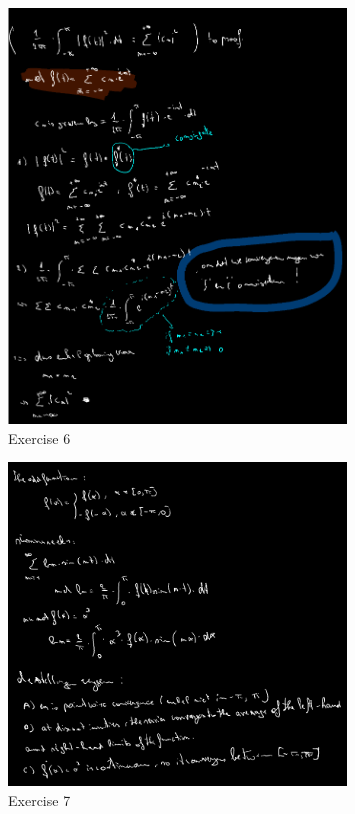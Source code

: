 \documentclass[a4paper]{report}
\begin{document}
\begin{figure}[H]
	\centering
	\includegraphics[width=0.8\textwidth]{assets/huis_9_ex_6.png}
	\caption{Exercise 6}
	\label{fig:huis_9_ex_6}
\end{figure}

\begin{figure}[H]
	\centering
	\includegraphics[width=0.8\textwidth]{assets/huis_9_ex_7.png}
	\caption{Exercise 7}
	\label{fig:huis_9_ex_7}
\end{figure}
\end{document}
